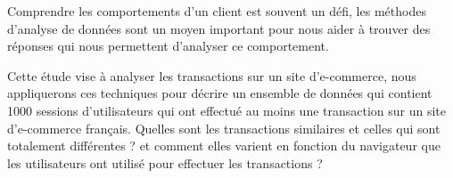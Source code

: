Comprendre les comportements d'un client est souvent un défi, les méthodes d'analyse de données sont un moyen important pour nous aider à trouver des réponses qui nous permettent d'analyser ce comportement.

Cette étude vise à analyser les transactions sur un site d'e-commerce, nous appliquerons ces techniques pour décrire un ensemble de données qui contient 1000 sessions d'utilisateurs qui ont effectué au moins une transaction sur un site d'e-commerce français. Quelles sont les transactions similaires et celles qui sont totalement différentes ? et comment elles varient en fonction du navigateur que les utilisateurs ont utilisé pour effectuer les transactions ?
